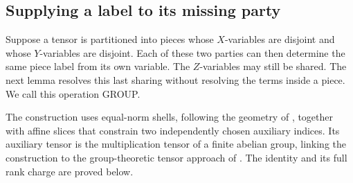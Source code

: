 \subsection{Supplying a label to its missing party}
\label{alg:group-section}
\label{sec:separation}

Suppose a tensor is partitioned into pieces whose \(X\)-variables are
disjoint and whose \(Y\)-variables are disjoint.  Each of these two parties
can then determine the same piece label from its own variable.  The
\(Z\)-variables may still be shared.  The next lemma resolves this last
sharing without resolving the terms inside a piece.  We call this operation
GROUP.

The construction uses equal-norm shells, following the geometry of
\citet{behrend}, together with affine slices that constrain two independently
chosen auxiliary indices.  Its auxiliary tensor is the multiplication
tensor of a finite abelian group, linking the construction to the
group-theoretic tensor approach of \citet{cohn-umans}.  The identity and its
full rank charge are proved below.


